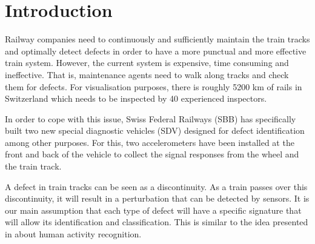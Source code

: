 



%



\maketitle

%
{
  \hypersetup{linkcolor=black}
  \tableofcontents
   
}
\newpage
\chapter{Introduction}
Railway companies need to continuously and sufficiently maintain the train tracks and optimally detect defects in order to have a more punctual and more effective train system. However, the current system is expensive, time consuming and ineffective. That is, maintenance agents need to walk along tracks and check them for defects. For visualisation purposes, there is roughly 5200 km of rails in Switzerland which needs to be inspected by 40 experienced inspectors.


In order to cope with this issue, Swiss Federal Railways (SBB) has specifically built two new special diagnostic vehicles (SDV) designed for defect identification among other purposes. For this, two accelerometers have been installed at the front and back of the vehicle to collect the signal responses from the wheel and the train track.

A defect in train tracks can be seen as a discontinuity. As a train passes over this discontinuity, it will result in a perturbation that can be detected by sensors. It is our main assumption that each type of defect will have a specific signature that will allow its identification and classification. This is similar to the idea presented in \cite{Introduc31:online} about human activity recognition.

